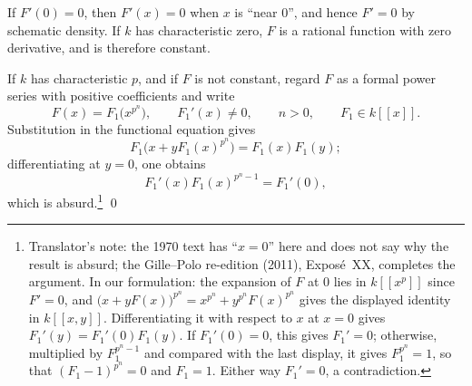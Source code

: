 If \(F'(0)=0\), then \(F'(x)=0\) when \(x\) is ``near \(0\)'', and
hence \(F'=0\) by schematic density.
If \(k\) has characteristic zero, \(F\) is a rational function
with zero derivative, and is therefore constant.

If \(k\) has characteristic \(p\), and if \(F\) is not constant,
regard \(F\) as a formal power series with positive coefficients
and write
\[
  F(x)=F_1\bigl(x^{p^n}\bigr),\qquad F_1'(x)\neq0,\qquad n>0,\qquad
  F_1\in k[[x]].
\]
Substitution in the functional equation gives
\[
  F_1\bigl(x+yF_1(x)^{p^n}\bigr)=F_1(x)F_1(y);
\]
differentiating at \(y=0\), one obtains
\[
  F_1'(x)F_1(x)^{p^n-1}=F_1'(0),
\]
which is absurd.\footnote{Translator's note: the 1970 text has ``\(x=0\)'' here and does not
say why the result is absurd; the Gille--Polo re-edition (2011), Exposé~XX, completes the argument.
In our formulation: the expansion of \(F\) at \(0\) lies in \(k[[x^p]]\) since \(F'=0\), and
\(\bigl(x+yF(x)\bigr)^{p^n}=x^{p^n}+y^{p^n}F(x)^{p^n}\) gives the displayed identity in
\(k[[x,y]]\). Differentiating it with respect to \(x\) at \(x=0\) gives
\(F_1'(y)=F_1'(0)F_1(y)\). If \(F_1'(0)=0\), this gives \(F_1'=0\); otherwise, multiplied by
\(F_1^{p^n-1}\) and compared with the last display, it gives \(F_1^{p^n}=1\), so that
\((F_1-1)^{p^n}=0\) and \(F_1=1\). Either way \(F_1'=0\), a contradiction.}
\qed

